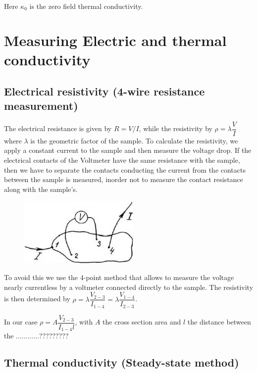 \documentclass[openany,11pt,a4paper]{report}
\begin{document}
Here $\kappa_{0}$ is the zero field thermal conductivity.












\section{Measuring Electric and thermal conductivity}

\subsection{Electrical resistivity (4-wire resistance measurement)\cite{4point}}

The electrical resistance is given by $R=V/I$, while the resistivity by $\rho= \lambda \dfrac{V}{I}$ where $\lambda$ is the geometric factor of the sample. To calculate the resistivity, we apply a constant current to the sample and then measure the voltage drop. If the electrical contacts of the Voltmeter have the same resistance with the sample, then we have to separate the contacts conducting the current from the contacts between the sample is measured, inorder not to measure the contact resistance along with the sample's.

\begin{figure}[H]
\centering
\includegraphics[scale=0.8]{4point.PNG}
\end{figure}

To avoid this we use the 4-point method that
allows to measure the voltage nearly currentless by a voltmeter connected directly to the sample. The resistivity is then determined by $\rho= \lambda \dfrac{V_{2-3}}{I_{1-4}}=\lambda \dfrac{V_{1-4}}{I_{2-3}}$.

In our case $\rho= A \dfrac{V_{2-3}}{I_{1-4} l}$, with $A$ the cross section area and $l$ the distance between the ............?????????

\subsection{Thermal conductivity (Steady-state method)}
\end{document}
